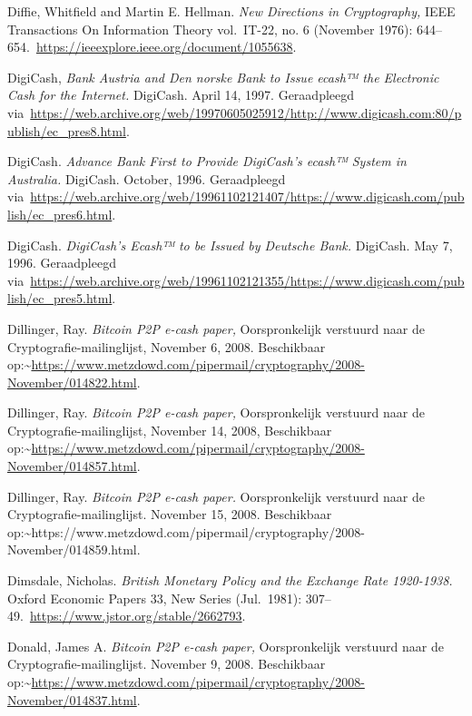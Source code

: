 \documentclass[smalldemyvopaper,11pt,twoside,onecolumn,openright,extrafontsizes,hidelinks]{memoir}
\begin{document}
Diffie, Whitfield and Martin E. Hellman. \emph{New Directions in
Cryptography,} IEEE Transactions On Information Theory vol.~IT-22, no. 6
(November 1976):
644--654.~\url{https://ieeexplore.ieee.org/document/1055638}.

DigiCash, \emph{Bank Austria and Den norske Bank to Issue ecash™ the
Electronic Cash for the Internet.} DigiCash. April 14, 1997.
Geraadpleegd
via~\href{https://web.archive.org/web/19970605025912/http:/www.digicash.com:80/publish/ec_pres8.html}{https://web.archive.org/web/19970605025912/http://www.digicash.com:80/publish/ec\_pres8.html}.

DigiCash. \emph{Advance Bank First to Provide DigiCash's ecash™ System
in Australia.} DigiCash. October, 1996. Geraadpleegd
via~\href{https://web.archive.org/web/19961102121407/https:/www.digicash.com/publish/ec_pres6.html}{https://web.archive.org/web/19961102121407/https://www.digicash.com/publish/ec\_pres6.html}.

DigiCash. \emph{DigiCash's Ecash™ to be Issued by Deutsche Bank.}
DigiCash. May 7, 1996. Geraadpleegd
via~\href{https://web.archive.org/web/19961102121355/https:/www.digicash.com/publish/ec_pres5.html}{https://web.archive.org/web/19961102121355/https://www.digicash.com/publish/ec\_pres5.html}.

Dillinger, Ray. \emph{Bitcoin P2P e-cash paper,} Oorspronkelijk
verstuurd naar de Cryptografie-mailinglijst, November 6, 2008.
Beschikbaar
op:\textasciitilde{}\url{https://www.metzdowd.com/pipermail/cryptography/2008-November/014822.html}.

Dillinger, Ray. \emph{Bitcoin P2P e-cash paper,} Oorspronkelijk
verstuurd naar de Cryptografie-mailinglijst, November 14, 2008,
Beschikbaar
op:\textasciitilde{}\url{https://www.metzdowd.com/pipermail/cryptography/2008-November/014857.html}.

Dillinger, Ray. \emph{Bitcoin P2P e-cash paper.} Oorspronkelijk
verstuurd naar de Cryptografie-mailinglijst. November 15, 2008.
Beschikbaar
op:\textasciitilde https://www.metzdowd.com/pipermail/cryptography/2008-November/014859.html.

Dimsdale, Nicholas. \emph{British Monetary Policy and the Exchange Rate
1920-1938.} Oxford Economic Papers 33, New Series (Jul.~1981):
307--49.~\url{https://www.jstor.org/stable/2662793}.

Donald, James A. \emph{Bitcoin P2P e-cash paper,} Oorspronkelijk
verstuurd naar de Cryptografie-mailinglijst. November 9, 2008.
Beschikbaar
op:\textasciitilde{}\url{https://www.metzdowd.com/pipermail/cryptography/2008-November/014837.html}.
\end{document}
